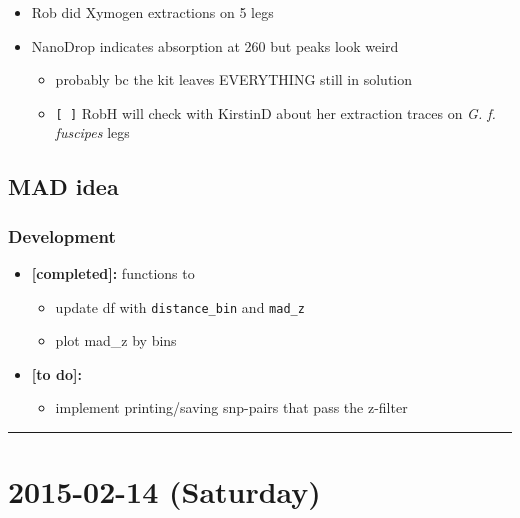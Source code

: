 \documentclass[letterpaper]{scrartcl}
\begin{document}
\begin{itemize}
\itemsep1pt\parskip0pt
\item
  Rob did Xymogen extractions on 5 legs
\item
  NanoDrop indicates absorption at 260 but peaks look weird

  \begin{itemize}
  \itemsep1pt\parskip0pt
  \item
    probably bc the kit leaves EVERYTHING still in solution
  \item
    \texttt{{[} {]}} RobH will check with KirstinD about her extraction
    traces on \emph{G. f. fuscipes} legs
  \end{itemize}
\end{itemize}

\subsection{MAD idea}\label{mad-idea-3}

\subsubsection{Development}\label{development-3}

\begin{itemize}
\itemsep1pt\parskip0pt
\item
  \textbf{{[}completed{]}:} functions to

  \begin{itemize}
  \itemsep1pt\parskip0pt
  \item
    update df with \texttt{distance\_bin} and \texttt{mad\_z}
  \item
    plot mad\_z by bins
  \end{itemize}
\item
  \textbf{{[}to do{]}:}

  \begin{itemize}
  \itemsep1pt\parskip0pt
  \item
    implement printing/saving snp-pairs that pass the z-filter
  \end{itemize}
\end{itemize}

\begin{center}\rule{0.5\linewidth}{\linethickness}\end{center}

\section{2015-02-14 (Saturday)}\label{saturday}
\end{document}
